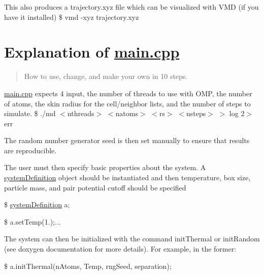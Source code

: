 This also produces a trajectory.\-xyz file which can be visualized with V\-M\-D (if you have it installed) \$ vmd -\/xyz trajectory.\-xyz

\section*{Explanation of \hyperlink{main_8cpp_source}{main.\-cpp}}

\begin{quotation}
How to use, change, and make your own in 10 steps.

\end{quotation}



\begin{DoxyEnumerate}
\item \hyperlink{main_8cpp_source}{main.\-cpp} expects 4 input, the number of threads to use with O\-M\-P, the number of atoms, the skin radius for the cell/neighbor lists, and the number of steps to simulate. \$ ./md $<$nthreads$>$ $<$natoms$>$ $<$rs$>$ $<$nsteps$>$ $>$ log 2$>$ err
\end{DoxyEnumerate}


\begin{DoxyEnumerate}
\item The random number generator seed is then set manually to ensure that results are reproducible.
\end{DoxyEnumerate}


\begin{DoxyEnumerate}
\item The user must then specify basic properties about the system. A \hyperlink{classsystem_definition}{system\-Definition} object should be instantiated and then temperature, box size, particle mass, and pair potential cutoff should be specified

\$ \hyperlink{classsystem_definition}{system\-Definition} a;

\$ a.\-set\-Temp(1.);...
\end{DoxyEnumerate}


\begin{DoxyEnumerate}
\item The system can then be initialized with the command init\-Thermal or init\-Random (see doxygen documentation for more details). For example, in the former\-:

\$ a.\-init\-Thermal(n\-Atoms, Temp, rng\-Seed, separation);
\end{DoxyEnumerate}


